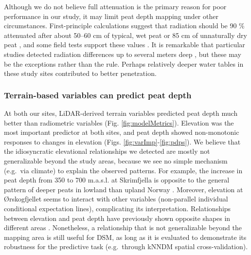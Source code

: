 \documentclass[soil, manuscript]{copernicus}
\begin{document}
Although we do not believe full attenuation is the primary reason for poor performance in our study, it may limit peat depth mapping under other circumstances.
First-principle calculations suggest that radiation should be 90 \% attenuated after about 50--60 cm of typical, wet peat or 85 cm of unnaturally dry peat \citep{beamishGammaRayAttenuation2013, beamishDetailedMappingPeat2024}, and some field tests support these values \citep{billenEignungGammaspektrometrieKartieren2015}.
It is remarkable that particular studies detected radiation differences up to several meters deep \citep{gatisMappingUplandPeat2019, kogantiMappingPeatDepth2023}, but these may be the exceptions rather than the rule.
Perhaps relatively deeper water tables in these study sites \citep[blanket bog, drained fen,][]{pricePeatlandRestorationHydrology2016} contributed to better penetration.

\subsubsection{Terrain-based variables can predict peat depth}

At both our sites, LiDAR-derived terrain variables predicted peat depth much better than radiometric variables (Fig. \ref{fig:modelMetrics}).
Elevation was the most important predictor at both sites, and peat depth showed non-monotonic responses to changes in elevation (Figs. \ref{fig:varImp}-\ref{fig:pdps}).
We believe that the idiosyncratic elevational relationships we detected are mostly not generalizable beyond the study areas, because we see no simple mechanism (e.g.~via climate) to explain the observed patterns.
For example, the increase in peat depth from 350 to 700 m.a.s.l. at Skrimfjella is opposite to the general pattern of deeper peats in lowland than upland Norway \citep{lyngstadBeskrivelserAvTorvmassivenheter2023}.
Moreover, elevation at Ørskogfjellet seems to interact with other variables (non-parallel individual conditional expectation lines), complicating its interpretation.
Relationships between elevation and peat depth have previously shown opposite shapes in different areas \citep{finlaysonEstimatingOrganicSurface2021}.
Nonetheless, a relationship that is not generalizable beyond the mapping area is still useful for DSM, as long as it is evaluated to demonstrate its robustness for the predictive task (e.g.~through kNNDM spatial cross-validation).
\end{document}
